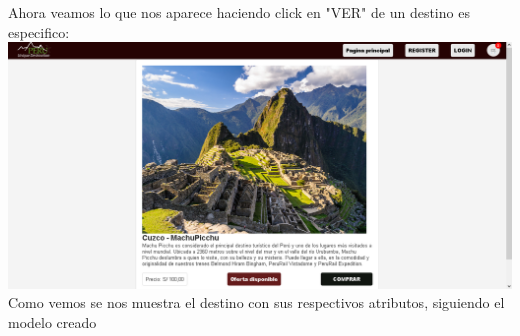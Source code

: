 \documentclass{article}
\begin{document}
        \newline\newline\newline
        Ahora veamos lo que nos aparece haciendo click en "VER" de un destino es especifico:
        \newline
        \includegraphics[width=16cm]{img/vistaDestinoEspecifico.png}
        Como vemos se nos muestra el destino con sus respectivos atributos, siguiendo el modelo creado\newline
\end{document}
